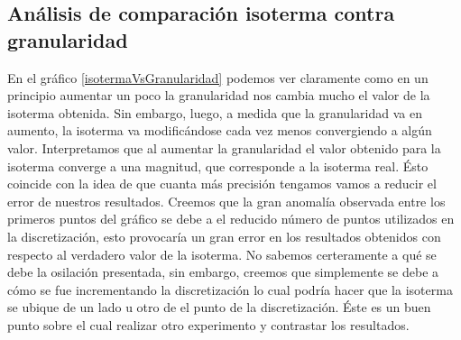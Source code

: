 \subsection{Análisis de comparación isoterma contra granularidad}
En el gráfico \ref{isotermaVsGranularidad} podemos ver claramente como en un principio aumentar un poco la granularidad 
nos cambia mucho el valor de la isoterma obtenida. Sin embargo, luego, a medida que la granularidad va en aumento, la 
isoterma va modificándose cada vez menos convergiendo a algún valor. Interpretamos que al aumentar la granularidad el 
valor obtenido para la isoterma converge a una magnitud, que corresponde a la isoterma real. Ésto coincide con la idea 
de que cuanta más precisión tengamos vamos a reducir el error de nuestros resultados. Creemos que la gran anomalía 
observada entre los primeros puntos del gráfico se debe a el reducido número de puntos utilizados en la 
discretización, esto provocaría un gran error en los resultados obtenidos con respecto al verdadero valor de la isoterma.
No sabemos certeramente a qué se debe la osilación presentada, sin embargo, creemos que simplemente se debe a cómo
se fue incrementando la discretización lo cual podría hacer que la isoterma se ubique de un lado u otro de el punto
de la discretización. Éste es un buen punto sobre el cual realizar otro experimento y contrastar los resultados.



